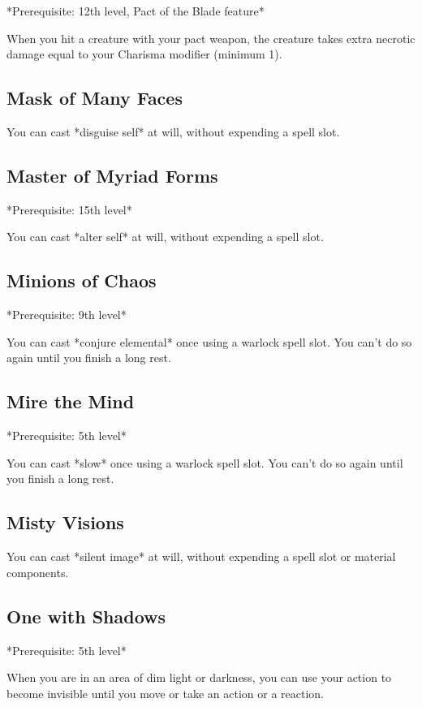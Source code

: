 *Prerequisite: 12th level, Pact of the Blade feature*

When you hit a creature with your pact weapon, the creature takes extra necrotic damage equal to your Charisma modifier (minimum 1).

\subsection{Mask of Many Faces}

You can cast *disguise self* at will, without expending a spell slot.

\subsection{Master of Myriad Forms}

*Prerequisite: 15th level*

You can cast *alter self* at will, without expending a spell slot.

\subsection{Minions of Chaos}

*Prerequisite: 9th level*

You can cast *conjure elemental* once using a warlock spell slot. You can’t do so again until you finish a long rest.

\subsection{Mire the Mind}

*Prerequisite: 5th level*

You can cast *slow* once using a warlock spell slot. You can’t do so again until you finish a long rest.

\subsection{Misty Visions}

You can cast *silent image* at will, without expending a spell slot or material components.

\subsection{One with Shadows}

*Prerequisite: 5th level*

When you are in an area of dim light or darkness, you can use your action to become invisible until you move or take an action or a reaction.

